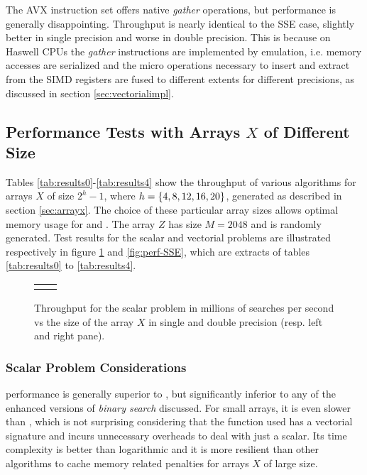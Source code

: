 \documentclass[preprint,1p,times]{elsarticle}
\begin{document}
The AVX instruction set offers native \textit{gather} operations, but performance is generally disappointing. Throughput is nearly identical to the SSE case, slightly better in single precision and worse in double precision. This is because on Haswell CPUs the \textit{gather} instructions are implemented by emulation, i.e. memory accesses are serialized and the micro operations necessary to insert and extract from the SIMD registers are fused to different extents for different precisions, as discussed in section \ref{sec:vectorialimpl}.

\subsection{Performance Tests with Arrays $X$ of Different Size}
\label{sec:testthroughput}
Tables \ref{tab:results0}-\ref{tab:results4} show the throughput of various algorithms for arrays $X$ of size $2^h-1$, where $h=\left \{ 4,8,12,16,20 \right \}$, generated as described in section \ref{sec:arrayx}. The choice of these particular array sizes allows optimal memory usage for \textit{\EytzingerName} and \textit{\BitSetName}. The array $Z$ has size $M=2048$ and is randomly generated. Test results for the scalar and vectorial problems are illustrated respectively in figure \ref{fig:perf-scalar} and \ref{fig:perf-SSE}, which are extracts of tables \ref{tab:results0} to \ref{tab:results4}.

\pgfplotsset{width=6cm} 

\begin{figure}%
\begin{tabular}{@{\hskip1pt}c@{\hskip1pt} @{\hskip1pt}c@{\hskip1pt}}
		\perfchart{scalar}{single} & \perfchart{scalar}{double}
\end{tabular}
\vspace*{-4mm}
\caption{Throughput for the scalar problem in millions of searches per second vs the size of the array $X$ in single and double precision (resp. left and right pane).}
\label{fig:perf-scalar}%
\end{figure}

\subsubsection{Scalar Problem Considerations}

\textit{\MKLName} performance is generally superior to \textit{\ClassicName}, but significantly inferior to any of the enhanced versions of \textit{binary search} discussed. For small arrays, it is even slower than \textit{\ClassicName}, which is not surprising considering that the function used has a vectorial signature and incurs unnecessary overheads to deal with just a scalar. Its time complexity is better than logarithmic and it is more resilient than other algorithms to cache memory related penalties for arrays $X$ of large size.
\end{document}

